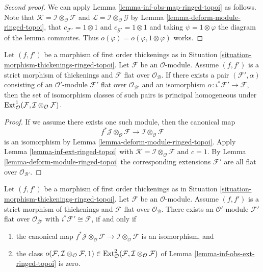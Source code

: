 \begin{proof}[Second proof]
We can apply Lemma \ref{lemma-inf-obs-map-ringed-topoi} as follows. Note that
$\mathcal{K} = \mathcal{I} \otimes_\mathcal{O} \mathcal{F}$ and
$\mathcal{L} = \mathcal{I} \otimes_\mathcal{O} \mathcal{G}$
by Lemma \ref{lemma-deform-module-ringed-topoi}, that
$c_{\mathcal{F}'} = 1 \otimes 1$ and $c_{\mathcal{G}'} = 1 \otimes 1$
and taking $\psi = 1 \otimes \varphi$ the diagram of the lemma
commutes. Thus $o(\varphi) = o(\varphi, 1 \otimes \varphi)$
works.
\end{proof}

\begin{lemma}
\label{lemma-inf-ext-rel-ringed-topoi}
Let $(f, f')$ be a morphism of first order thickenings as in
Situation \ref{situation-morphism-thickenings-ringed-topoi}.
Let $\mathcal{F}$ be an $\mathcal{O}$-module.
Assume $(f, f')$ is a strict morphism of thickenings and
$\mathcal{F}$ flat over $\mathcal{O}_\mathcal{B}$. If there exists a pair
$(\mathcal{F}', \alpha)$ consisting of an
$\mathcal{O}'$-module $\mathcal{F}'$ flat over $\mathcal{O}_{\mathcal{B}'}$
and an isomorphism
$\alpha : i^*\mathcal{F}' \to \mathcal{F}$, then the set of
isomorphism classes of such pairs is principal homogeneous
under
$\mathop{\mathrm{Ext}}\nolimits^1_\mathcal{O}(
\mathcal{F}, \mathcal{I} \otimes_\mathcal{O} \mathcal{F})$.
\end{lemma}

\begin{proof}
If we assume there exists one such module, then the canonical map
$$
f^*\mathcal{J} \otimes_\mathcal{O} \mathcal{F} \to
\mathcal{I} \otimes_\mathcal{O} \mathcal{F}
$$
is an isomorphism by Lemma \ref{lemma-deform-module-ringed-topoi}. Apply
Lemma \ref{lemma-inf-ext-ringed-topoi} with $\mathcal{K} = 
\mathcal{I} \otimes_\mathcal{O} \mathcal{F}$
and $c = 1$. By Lemma \ref{lemma-deform-module-ringed-topoi}
the corresponding extensions
$\mathcal{F}'$ are all flat over $\mathcal{O}_{\mathcal{B}'}$.
\end{proof}

\begin{lemma}
\label{lemma-inf-obs-ext-rel-ringed-topoi}
Let $(f, f')$ be a morphism of first order thickenings as in
Situation \ref{situation-morphism-thickenings-ringed-topoi}.
Let $\mathcal{F}$ be an $\mathcal{O}$-module. Assume
$(f, f')$ is a strict morphism of thickenings
and $\mathcal{F}$ flat over $\mathcal{O}_\mathcal{B}$. There exists an
$\mathcal{O}'$-module $\mathcal{F}'$ flat over $\mathcal{O}_{\mathcal{B}'}$
with $i^*\mathcal{F}' \cong \mathcal{F}$, if and only if
\begin{enumerate}
\item the canonical map
$f^*\mathcal{J} \otimes_\mathcal{O} \mathcal{F} \to
\mathcal{I} \otimes_\mathcal{O} \mathcal{F}$
is an isomorphism, and
\item the class
$o(\mathcal{F}, \mathcal{I} \otimes_\mathcal{O} \mathcal{F}, 1)
\in \mathop{\mathrm{Ext}}\nolimits^2_\mathcal{O}(
\mathcal{F}, \mathcal{I} \otimes_\mathcal{O} \mathcal{F})$
of Lemma \ref{lemma-inf-obs-ext-ringed-topoi} is zero.
\end{enumerate}
\end{lemma}

